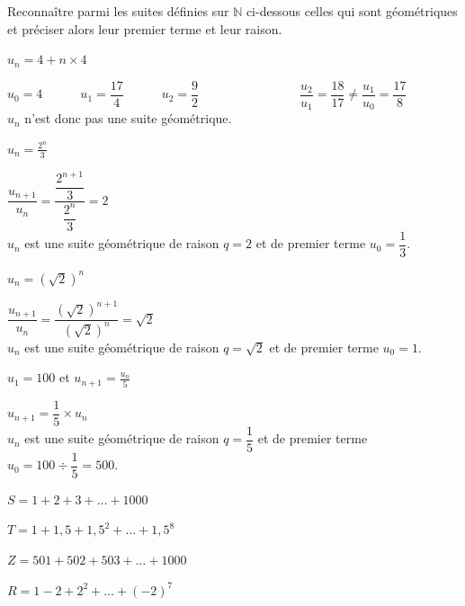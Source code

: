 \documentclass[12pt,a4paper]{article}  %
\begin{document}
Reconnaître parmi les suites définies sur $\mathbb{N}$ ci-dessous celles qui sont géométriques et préciser alors leur premier terme et leur raison.
\begin{enumMet}
    \item $u_{n}=4+n \times 4$\\
    \begin{corrBox}
        $u_0=4\quad\quad\quad u_1=\dfrac{17}{4}\quad\quad\quad u_2=\dfrac{9}{2}\quad\quad\quad\quad\quad\quad\quad\quad \dfrac{u_2}{u_1}=\dfrac{18}{17}\neq \dfrac{u_1}{u_0}=\dfrac{17}{8}$\\
        $u_n$ n'est donc pas une suite géométrique.\quad{}
    \end{corrBox}
    \item $u_{n}=\frac{2^{n}}{3}$\\
    \begin{corrBox}
        $\dfrac{u_{n+1}}{u_n}=\dfrac{\dfrac{2^{n+1}}{3}}{\dfrac{2^n}{3}}=2$\\
        $u_n$ est une suite géométrique de raison $q=2$ et de premier terme $u_0=\dfrac{1}{3}$.\quad{}
    \end{corrBox}
    \item $u_{n}=(\sqrt{2})^{n}$\\
    \begin{corrBox}
        $\dfrac{u_{n+1}}{u_n}=\dfrac{(\sqrt{2})^{n+1}}{(\sqrt{2})^{n}}=\sqrt{2}$\\
        $u_n$ est une suite géométrique de raison $q=\sqrt{2}$ et de premier terme $u_0=1$.\quad{}
    \end{corrBox}
    \item $u_{1}=100$ et $u_{n+1}=\frac{u_{n}}{5}$\\
    \begin{corrBox}
        $u_{n+1}=\dfrac{1}{5}\times u_n$\\
        $u_n$ est une suite géométrique de raison $q=\dfrac{1}{5}$ et de premier terme $u_0=100\div \dfrac{1}{5}=500$.\quad{}
    \end{corrBox}
\end{enumMet}


\begin{enumMet}
    \item $S = 1+2+3+\ldots+1000$ \quad{}
    \item $T = 1+1,5+1,5^{2}+\ldots+1,5^{8}$ \quad{}
    \item $Z = 501+502+503+\ldots+1000$ \quad{}
    \item $R = 1-2+2^2+\ldots+(-2)^7$ \quad{}
\end{enumMet}
\end{document}
